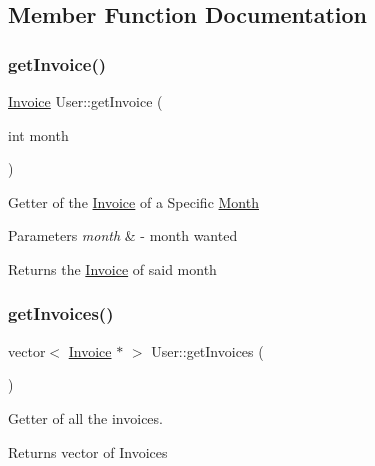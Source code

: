 \subsection{Member Function Documentation}
\mbox{\label{class_user_a4fafb4511574972c6e7801f2bb6a638b}} 
\subsubsection{\texorpdfstring{get\+Invoice()}{getInvoice()}}
{\footnotesize\ttfamily \mbox{\hyperlink{class_invoice}{Invoice}} User\+::get\+Invoice (\begin{DoxyParamCaption}\item[{int}]{month }\end{DoxyParamCaption})}

Getter of the \mbox{\hyperlink{class_invoice}{Invoice}} of a Specific \mbox{\hyperlink{class_month}{Month}} 
\begin{DoxyParams}{Parameters}
{\em month} & -\/ month wanted \\
\hline
\end{DoxyParams}
\begin{DoxyReturn}{Returns}
the \mbox{\hyperlink{class_invoice}{Invoice}} of said month 
\end{DoxyReturn}
\mbox{\label{class_user_aeb297e5cd248e1e2c0ae3540cbedcca8}} 
\subsubsection{\texorpdfstring{get\+Invoices()}{getInvoices()}}
{\footnotesize\ttfamily vector$<$ \mbox{\hyperlink{class_invoice}{Invoice}} $\ast$ $>$ User\+::get\+Invoices (\begin{DoxyParamCaption}{ }\end{DoxyParamCaption})}



Getter of all the invoices. 

\begin{DoxyReturn}{Returns}
vector of Invoices 
\end{DoxyReturn}
\mbox{\label{class_user_ac1af1ded379bd2fd56f96f90348520fe}} 
